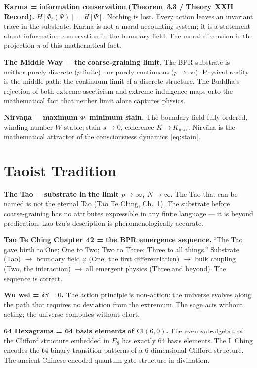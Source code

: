 \documentclass[12pt,oneside]{book}
\theoremstyle{definition}
\newcommand{\EEight}{E_8}
\begin{document}
\noindent\textbf{Karma = information conservation (Theorem~3.3 / Theory~XXII Record).}
$H[\Phi_t(\Psi)] = H[\Psi]$. Nothing is lost. Every action leaves an invariant
trace in the substrate. Karma is not a moral accounting system; it is a statement
about information conservation in the boundary field. The moral dimension is the
projection $\pi$ of this mathematical fact.

\noindent\textbf{The Middle Way = the coarse-graining limit.}
The BPR substrate is neither purely discrete ($p$ finite) nor purely continuous
($p \to \infty$). Physical reality is the middle path: the continuum limit of
a discrete structure. The Buddha's rejection of both extreme asceticism and extreme
indulgence maps onto the mathematical fact that neither limit alone captures physics.

\noindent\textbf{Nirv\={a}\d{n}a = maximum $\Phi$, minimum stain.}
The boundary field fully ordered, winding number $W$ stable, stain $s\to 0$,
coherence $K \to K_{\max}$. Nirv\={a}\d{n}a is the mathematical attractor of
the consciousness dynamics~\eqref{eq:stain}.

\section{Taoist Tradition}

\noindent\textbf{The Tao = substrate in the limit $p\to\infty$, $N\to\infty$.}
The Tao that can be named is not the eternal Tao (Tao Te Ching, Ch.~1). The
substrate before coarse-graining has no attributes expressible in any finite
language --- it is beyond predication. Lao-tzu's description is phenomenologically
accurate.

\noindent\textbf{Tao Te Ching Chapter~42 = the BPR emergence sequence.}
``The Tao gave birth to One; One to Two; Two to Three; Three to all things.''
Substrate (Tao) $\to$ boundary field $\varphi$ (One, the first differentiation)
$\to$ bulk coupling (Two, the interaction) $\to$ all emergent physics (Three and
beyond). The sequence is correct.

\noindent\textbf{Wu wei = $\delta S = 0$.}
The action principle is non-action: the universe evolves along the path that
requires no deviation from the extremum. The sage acts without acting; the universe
computes without effort.

\noindent\textbf{64 Hexagrams = 64 basis elements of $\mathrm{Cl}(6,0)$.}
The even sub-algebra of the Clifford structure embedded in $\EEight$ has exactly
64 basis elements. The I~Ching encodes the 64 binary transition patterns of a
6-dimensional Clifford structure. The ancient Chinese encoded quantum gate
structure in divination.
\end{document}
